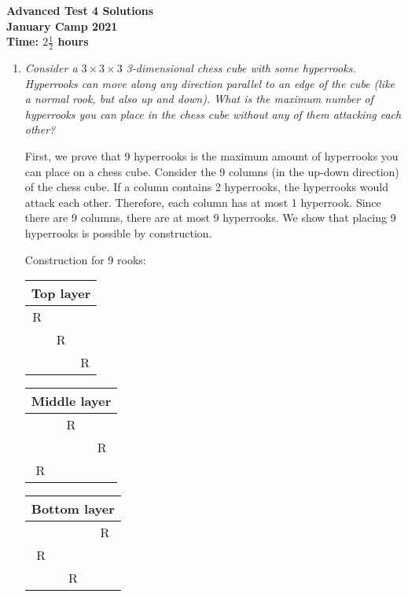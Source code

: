 \documentclass{article}
\begin{document}
\thispagestyle{empty}

\begin{center}
  \textbf{\Large Advanced Test 4 Solutions}
  \\ \vspace{1em}
  \textbf{\large January Camp 2021}
  \\ \vspace{1em}
  \textbf{\large Time: $2\frac{1}{2}$ hours}
\end{center}

\vspace{12pt}

\begin{enumerate}[1.]

\item %
{\itshape Consider a $3\times3\times3$ 3-dimensional chess cube with some hyperrooks.
Hyperrooks can move along any direction parallel to an edge of the cube (like a normal rook, but also up and down).
What is the maximum number of hyperrooks you can place in the chess cube without any of them attacking each other?}

First, we prove that 9 hyperrooks is the maximum amount of hyperrooks you can place on a chess cube. Consider the 9 columns (in the up-down direction) of the chess cube. If a column contains 2 hyperrooks, the hyperrooks would attack each other. Therefore, each column has at most 1 hyperrook. Since there are 9 columns, there are at most 9 hyperrooks. We show that placing 9 hyperrooks is possible by construction.

Construction for 9 rooks:
\begin{table}[h]
\centering
\begin{tabular}{| c | c| c |}
\multicolumn{3}{c}{Top layer}\\
\hline
R& &\\
\hline
&R&\\
\hline
&&R\\
\hline
\end{tabular}
\quad
\begin{tabular}{| c | c| c |}
\multicolumn{3}{c}{Middle layer}\\
\hline
&R &\\
\hline
&&R\\
\hline
R&&\\
\hline
\end{tabular}
\quad
\begin{tabular}{| c | c| c |}
\multicolumn{3}{c}{Bottom layer}\\
\hline
& &R\\
\hline
R&&\\
\hline
&R&\\
\hline
\end{tabular}
\end{table}


\end{enumerate}
\end{document}
